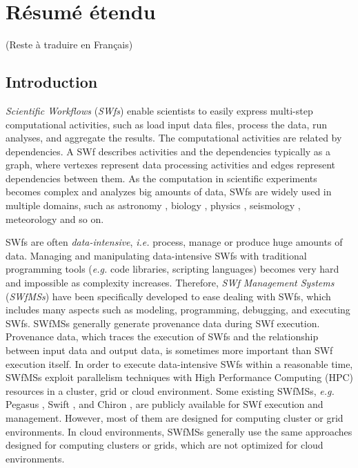 \chapter{Résumé étendu}
(Reste à traduire en Français)
\section*{Introduction}

\textit{Scientific Workflows} (\textit{SWfs}) enable scientists to easily express multi-step computational activities, such as load input data files, process the data, run analyses, and aggregate the results. The computational activities are related by dependencies. A SWf describes activities and the dependencies typically as a graph, where vertexes represent data processing activities and edges represent dependencies between them. 
As the computation in scientific experiments becomes complex and analyzes big amounts of data, SWfs are widely used in multiple domains, such as astronomy \cite{Deelman2008}, biology \cite{Ocana2012}, physics \cite{Ogasawara2011}, seismology \cite{Deelman2006z}, meteorology \cite{Woitaszek2011} and so on.

SWfs are often \textit{data-intensive}, \textit{i.e.} process, manage or produce huge amounts of data.
Managing and manipulating data-intensive SWfs with traditional programming tools (\textit{e.g.} code libraries, scripting languages) becomes very hard and impossible as complexity increases. 
Therefore, \textit{SWf Management Systems} (\textit{SWfMSs}) have been specifically developed to ease dealing with SWfs, which includes many aspects such as modeling, programming, debugging, and executing SWfs. 
SWfMSs generally generate provenance data during SWf execution.
Provenance data, which traces the execution of SWfs and the relationship between input data and output data, is sometimes more important than SWf execution itself.
In order to execute data-intensive SWfs within a reasonable time, SWfMSs exploit parallelism techniques with High Performance Computing (HPC) resources in a cluster, grid or cloud environment. 
Some existing SWfMSs, \textit{e.g.} Pegasus \cite{Deelman2005,Deelman2014}, Swift \cite{Zhao2007},
and Chiron \cite{Ogasawara2013}, are publicly available for SWf execution and management. 
However, most of them are designed for computing cluster or grid environments. 
In cloud environments, SWfMSs generally use the same approaches designed for computing clusters or grids, which are not optimized for cloud environments. 

